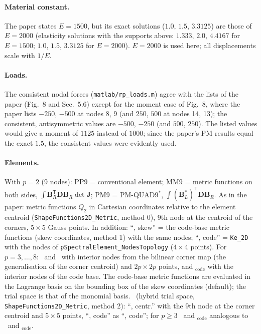 \documentclass[10pt,a4paper]{article}
\begin{document}
\paragraph{Material constant.} The paper states $E=1500$, but its exact solutions ($1.0$,
$1.5$, $3.3125$) are those of $E=2000$ (elasticity solutions with the supports above: $1.333$,
$2.0$, $4.4167$ for $E=1500$; $1.0$, $1.5$, $3.3125$ for $E=2000$). $E=2000$ is used here; all
displacements scale with $1/E$.

\paragraph{Loads.} The consistent nodal forces (\texttt{matlab/rp\_loads.m}) agree with the
lists of the paper (Fig.~8 and Sec.~5.6) except for the moment case of Fig.~8, where the
paper lists $-250$, $-500$ at nodes 8, 9 (and $250$, $500$ at nodes 14, 13); the consistent,
antisymmetric values are $-500$, $-250$ (and $500$, $250$). The listed values would give a
moment of $1125$ instead of $1000$; since the paper's PM results equal the exact $1.5$, the
consistent values were evidently used.

\paragraph{Elements.} With $p=2$ (9 nodes):
PP9 = conventional element; MM9 = metric functions on both sides, $\int\bm B_R^{\mathsf T}\bm D
\bm B_R\det\bm J$; PM9 = PM-QUAD9$^\ast$, $\int(\bm B_L^\ast)^{\mathsf T}\bm D\bm B_R$. As in the
paper: metric functions $Q_2$ in Cartesian coordinates relative to the element centroid
(\texttt{ShapeFunctions2D\_Metric}, method 0), 9th node at the centroid of the corners,
$5\times5$ Gauss points. In addition: ``\PM, skew'' = the code-base metric functions (skew
coordinates, method 1) with the same nodes; ``\PM, code'' = \texttt{Ke\_2D} with the nodes of
\texttt{pSpectralElement\_NodesTopology} ($4\times4$ points). For $p=3,\dots,8$: \PP\ and \PM\
with interior nodes from the bilinear corner map (the generalisation of the corner centroid)
and $2p\times2p$ points, and \PM$_\mathrm{code}$ with the interior nodes of the code base. The
code-base metric functions are evaluated in the Lagrange basis on the bounding box of the skew
coordinates (default); the trial space is that of the monomial basis. \PH\ (hybrid trial space,
\texttt{ShapeFunctions2D\_Metric}, method 2): ``\PH, centr.'' with the 9th node at the corner
centroid and $5\times5$ points, ``\PH, code'' as ``\PM, code''; for $p\ge3$ \PH\ and
\PH$_\mathrm{code}$ analogous to \PM\ and \PM$_\mathrm{code}$.
\end{document}
